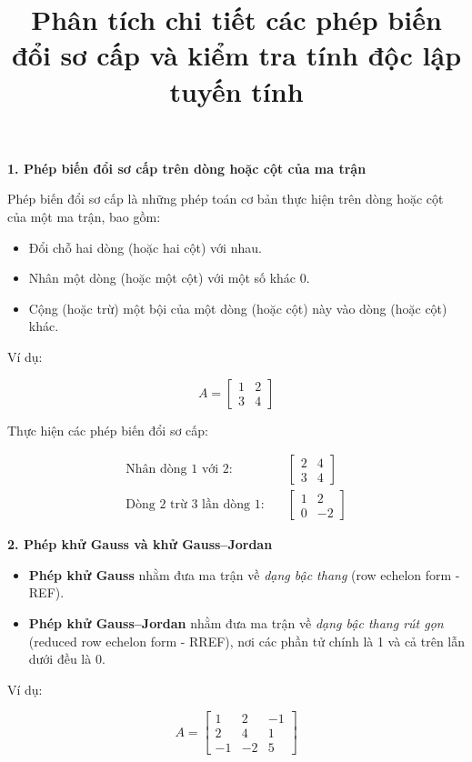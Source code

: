 \documentclass[12pt]{article}
\title{Phân tích chi tiết các phép biến đổi sơ cấp và kiểm tra tính độc lập tuyến tính}
\date{}
\begin{document}
\maketitle

\textbf{1. Phép biến đổi sơ cấp trên dòng hoặc cột của ma trận}

Phép biến đổi sơ cấp là những phép toán cơ bản thực hiện trên dòng hoặc cột của một ma trận, bao gồm:

\begin{itemize}
    \item Đổi chỗ hai dòng (hoặc hai cột) với nhau.
    \item Nhân một dòng (hoặc một cột) với một số khác 0.
    \item Cộng (hoặc trừ) một bội của một dòng (hoặc cột) này vào dòng (hoặc cột) khác.
\end{itemize}

Ví dụ:

\[
A = \begin{bmatrix} 1 & 2 \\ 3 & 4 \end{bmatrix}
\]

Thực hiện các phép biến đổi sơ cấp:

\begin{align*}
\text{Nhân dòng 1 với 2:} &\quad \begin{bmatrix} 2 & 4 \\ 3 & 4 \end{bmatrix} \\
\text{Dòng 2 trừ 3 lần dòng 1:} &\quad \begin{bmatrix} 1 & 2 \\ 0 & -2 \end{bmatrix}
\end{align*}

\vspace{1em}
\textbf{2. Phép khử Gauss và khử Gauss–Jordan}

\begin{itemize}
    \item \textbf{Phép khử Gauss} nhằm đưa ma trận về \textit{dạng bậc thang} (row echelon form - REF).
    \item \textbf{Phép khử Gauss–Jordan} nhằm đưa ma trận về \textit{dạng bậc thang rút gọn} (reduced row echelon form - RREF), nơi các phần tử chính là 1 và cả trên lẫn dưới đều là 0.
\end{itemize}

Ví dụ:

\[
A = \begin{bmatrix} 1 & 2 & -1 \\ 2 & 4 & 1 \\ -1 & -2 & 5 \end{bmatrix}
\]
\end{document}
